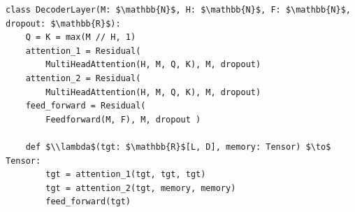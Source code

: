 \documentclass[border=10pt]{standalone}
\begin{document}
\begin{lstlisting}
class DecoderLayer(M: $\mathbb{N}$, H: $\mathbb{N}$, F: $\mathbb{N}$, dropout: $\mathbb{R}$):
    Q = K = max(M // H, 1)
    attention_1 = Residual(
        MultiHeadAttention(H, M, Q, K), M, dropout)
    attention_2 = Residual(
        MultiHeadAttention(H, M, Q, K), M, dropout)
    feed_forward = Residual(
        Feedforward(M, F), M, dropout )

    def $\\lambda$(tgt: $\mathbb{R}$[L, D], memory: Tensor) $\to$ Tensor:
        tgt = attention_1(tgt, tgt, tgt)
        tgt = attention_2(tgt, memory, memory)
        feed_forward(tgt)
\end{lstlisting}
\end{document}
